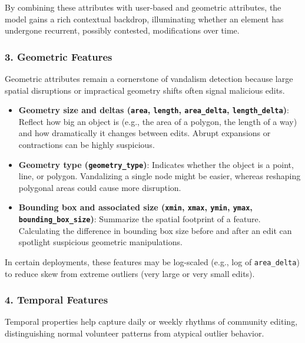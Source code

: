 \documentclass[
    13pt, %
    a4paper, %
    twoside, 
    DIV14, %
    listof=totoc, %
    bibliography=totoc, %
    index=totoc, %
    headsepline
]{scrreprt}
\begin{document}
By combining these attributes with user-based and geometric attributes, the model gains a rich contextual backdrop, illuminating whether an element has undergone recurrent, possibly contested, modifications over time.

\subsubsection*{3. Geometric Features}
Geometric attributes remain a cornerstone of vandalism detection because large spatial disruptions or impractical geometry shifts often signal malicious edits.

\begin{itemize}
  \item \textbf{Geometry size and deltas (\texttt{area}, \texttt{length}, \texttt{area\_delta}, \texttt{length\_delta})}: Reflect how big an object is (e.g., the area of a polygon, the length of a way) and how dramatically it changes between edits. Abrupt expansions or contractions can be highly suspicious.
  \item \textbf{Geometry type (\texttt{geometry\_type})}: Indicates whether the object is a point, line, or polygon. Vandalizing a single node might be easier, whereas reshaping polygonal areas could cause more disruption.
  \item \textbf{Bounding box and associated size (\texttt{xmin}, \texttt{xmax}, \texttt{ymin}, \texttt{ymax}, \texttt{bounding\_box\_size})}: Summarize the spatial footprint of a feature. Calculating the difference in bounding box size before and after an edit can spotlight suspicious geometric manipulations.
\end{itemize}

In certain deployments, these features may be log-scaled (e.g., log of \texttt{area\_delta}) to reduce skew from extreme outliers (very large or very small edits).

\subsubsection*{4. Temporal Features}
Temporal properties help capture daily or weekly rhythms of community editing, distinguishing normal volunteer patterns from atypical outlier behavior.
\end{document}
